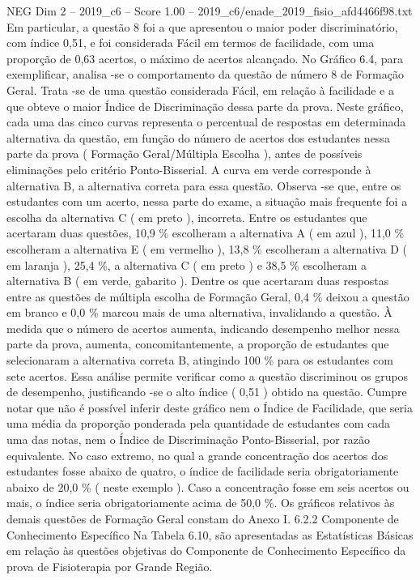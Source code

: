 \begin{textsample}{NEG Dim 2 – 2019\_c6 – Score 1.00 – 2019\_c6/enade\_2019\_fisio\_afd4466f98.txt}
Em particular, a questão 8 foi a que apresentou o maior poder discriminatório, com índice 0,51, e foi considerada Fácil em termos de facilidade, com uma proporção de 0,63 acertos, o máximo de acertos alcançado.
No Gráfico 6.4, para exemplificar, analisa -se o comportamento da questão de número 8 de Formação Geral.
Trata -se de uma questão considerada Fácil, em relação à facilidade e a que obteve o maior Índice de Discriminação dessa parte da prova.
Neste gráfico, cada uma das cinco curvas representa o percentual de respostas em determinada alternativa da questão, em função do número de acertos dos estudantes nessa parte da prova ( Formação Geral/Múltipla Escolha ), antes de possíveis eliminações pelo critério Ponto-Bisserial.
A curva em verde corresponde à alternativa B, a alternativa correta para essa questão.
Observa -se que, entre os estudantes com um acerto, nessa parte do exame, a situação mais frequente foi a escolha da alternativa C ( em preto ), incorreta.
Entre os estudantes que acertaram duas questões, 10,9 \% escolheram a alternativa A ( em azul ), 11,0 \% escolheram a alternativa E ( em vermelho ), 13,8 \% escolheram a alternativa D ( em laranja ), 25,4 \%, a alternativa C ( em preto ) e 38,5 \% escolheram a alternativa B ( em verde, gabarito ).
Dentre os que acertaram duas respostas entre as questões de múltipla escolha de Formação Geral, 0,4 \% deixou a questão em branco e 0,0 \% marcou mais de uma alternativa, invalidando a questão.
À medida que o número de acertos aumenta, indicando desempenho melhor nessa parte da prova, aumenta, concomitantemente, a proporção de estudantes que selecionaram a alternativa correta B, atingindo 100 \% para os estudantes com sete acertos.
Essa análise permite verificar como a questão discriminou os grupos de desempenho, justificando -se o alto índice ( 0,51 ) obtido na questão.
Cumpre notar que não é possível inferir deste gráfico nem o Índice de Facilidade, que seria uma média da proporção ponderada pela quantidade de estudantes com cada uma das notas, nem o Índice de Discriminação Ponto-Bisserial, por razão equivalente.
No caso extremo, no qual a grande concentração dos acertos dos estudantes fosse abaixo de quatro, o índice de facilidade seria obrigatoriamente abaixo de 20,0 \% ( neste exemplo ).
Caso a concentração fosse em seis acertos ou mais, o índice seria obrigatoriamente acima de 50,0 \%.
Os gráficos relativos às demais questões de Formação Geral constam do Anexo I. 6.2.2 Componente de Conhecimento Específico Na Tabela 6.10, são apresentadas as Estatísticas Básicas em relação às questões objetivas do Componente de Conhecimento Específico da prova de Fisioterapia por Grande Região.

\end{textsample}
